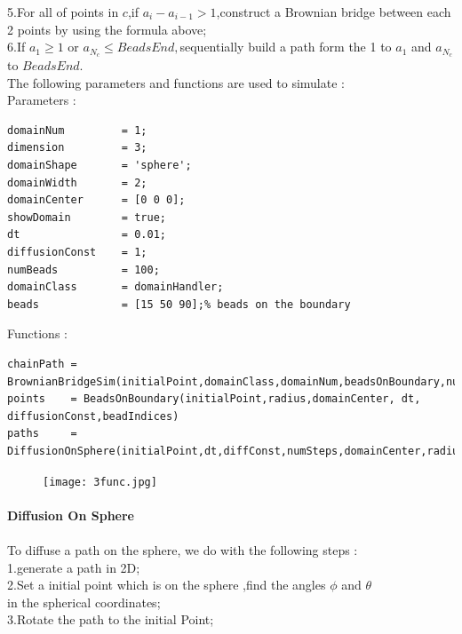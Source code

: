 \documentclass{article}
\begin{document}
5.For all of points in $c$,if $a_{i}-a_{i-1}>1$,construct a Brownian bridge between each 2 points by using the formula above;\\

6.If $a_1 \geq 1$ or $a_{N_c} \leq BeadsEnd,$sequentially build a path form the 1 to $a_1$ and $a_{N_c}$ to $BeadsEnd$.\\

The following parameters and functions are used to simulate :\\

Parameters :
\begin{lstlisting}
domainNum         = 1;
dimension         = 3;
domainShape       = 'sphere';
domainWidth       = 2;
domainCenter      = [0 0 0];
showDomain        = true;
dt                = 0.01;
diffusionConst    = 1;
numBeads          = 100;
domainClass       = domainHandler;
beads             = [15 50 90];% beads on the boundary
\end{lstlisting}

Functions :
\begin{lstlisting}
chainPath = BrownianBridgeSim(initialPoint,domainClass,domainNum,beadsOnBoundary,numBeads)
points    = BeadsOnBoundary(initialPoint,radius,domainCenter, dt, diffusionConst,beadIndices)
paths     = DiffusionOnSphere(initialPoint,dt,diffConst,numSteps,domainCenter,radius)
\end{lstlisting}
\begin{figure}[H]
\texttt{[image: 3func.jpg]}
\end{figure}
\paragraph{Diffusion On Sphere}
\paragraph{}
To diffuse a path on the sphere, we do with the following steps :\\

1.generate a path in 2D;\\

2.Set a initial point which is on the sphere ,find the angles $\phi$ and $\theta$\\ 

in the spherical coordinates;\\

3.Rotate the path to the initial Point;\\
\end{document}
